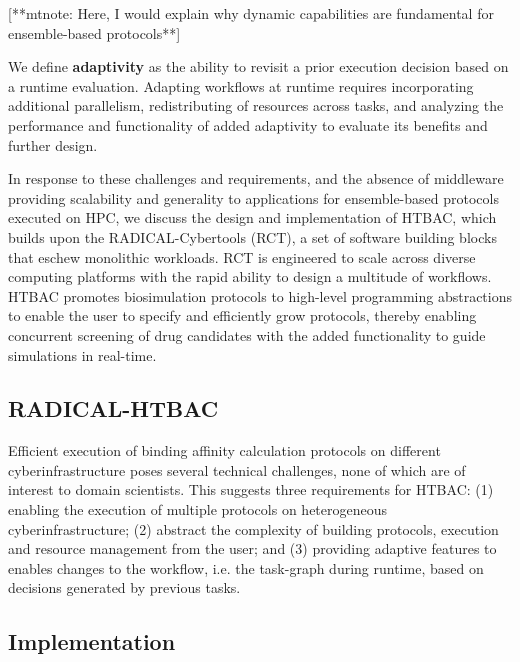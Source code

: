[**mtnote: Here, I would explain why dynamic capabilities are fundamental for
ensemble-based protocols**]

We define \textbf{adaptivity} as the ability to revisit a prior execution
decision based on a runtime evaluation. Adapting workflows at runtime
requires incorporating additional parallelism, redistributing of resources
across tasks, and analyzing the performance and functionality of added
adaptivity to evaluate its benefits and further design.

In response to these challenges and requirements, and the absence of
middleware providing scalability and generality to applications for
ensemble-based protocols executed on HPC, we discuss the design and
implementation of HTBAC, which builds upon the RADICAL-Cybertools (RCT), a
set of software building blocks that eschew monolithic workloads. RCT is
engineered to scale across diverse computing platforms with the rapid ability
to design a multitude of workflows. HTBAC promotes biosimulation protocols to
high-level programming abstractions to enable the user to specify and
efficiently grow protocols, thereby enabling concurrent screening of drug
candidates with the added functionality to guide simulations in real-time.


\subsection{RADICAL-HTBAC}

Efficient execution of binding affinity calculation protocols on different
cyberinfrastructure poses several technical challenges, none of which are of
interest to domain scientists. This suggests three requirements for HTBAC\@:
(1) enabling the execution of multiple protocols on heterogeneous
cyberinfrastructure; (2) abstract the complexity of building protocols,
execution and resource management from the user; and (3) providing adaptive
features to enables changes to the workflow, i.e. the task-graph during
runtime, based on decisions generated by previous tasks.


\subsection{Implementation}

